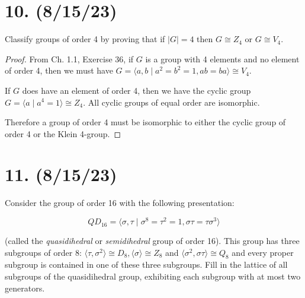 \documentclass{article}
\begin{document}
\section*{10. (8/15/23)}

Classify groups of order 4 by proving that if $|G| = 4$ then $G \cong Z_4$ or $G \cong V_4$.

\begin{proof}
    From Ch. 1.1, Exercise 36, if $G$ is a group with 4 elements and no element of order 4, then we must have $G = \langle a, b \mid a^2 = b^2 = 1, ab = ba \rangle \cong V_4$.

    If $G$ does have an element of order 4, then we have the cyclic group $G = \langle a \mid a^4 = 1 \rangle \cong Z_4$. All cyclic groups of equal order are isomorphic.

    Therefore a group of order 4 must be isomorphic to either the cyclic group of order 4 or the Klein 4-group.
\end{proof}

\section*{11. (8/15/23)}

Consider the group of order 16 with the following presentation:

\begin{equation*}
    QD_{16} = \langle \sigma, \tau \mid \sigma^8 = \tau^2 = 1, \sigma \tau = \tau \sigma^3 \rangle
\end{equation*}

(called the \emph{quasidihedral} or \emph{semidihedral} group of order 16). This group has three subgroups of order 8: $\langle \tau, \sigma^2 \rangle \cong D_8, \langle \sigma \rangle \cong Z_8$ and $\langle \sigma^2, \sigma \tau \rangle \cong Q_8$ and every proper subgroup is contained in one of these three subgroups. Fill in the lattice of all subgroups of the quasidihedral group, exhibiting each subgroup with at most two generators.
\end{document}
